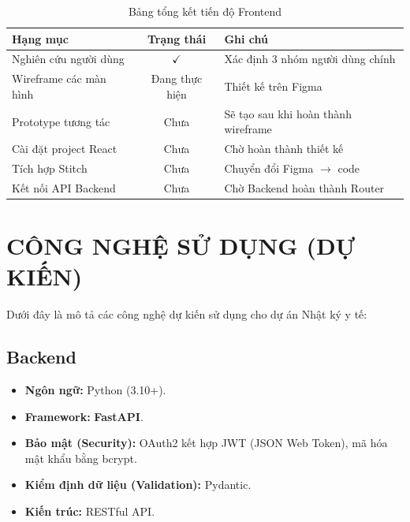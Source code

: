 \documentclass[a4paper,12pt]{article}
\begin{document}
\begin{table}[H]
    \centering
    \begin{tabularx}{\textwidth}{|l|c|X|}
    \hline
    \textbf{Hạng mục} & \textbf{Trạng thái} & \textbf{Ghi chú} \\
    \hline
    Nghiên cứu người dùng & $\checkmark$ & Xác định 3 nhóm người dùng chính \\
    \hline
    Wireframe các màn hình & Đang thực hiện & Thiết kế trên Figma \\
    \hline
    Prototype tương tác & Chưa & Sẽ tạo sau khi hoàn thành wireframe \\
    \hline
    Cài đặt project React & Chưa & Chờ hoàn thành thiết kế \\
    \hline
    Tích hợp Stitch & Chưa & Chuyển đổi Figma $\rightarrow$ code \\
    \hline
    Kết nối API Backend & Chưa & Chờ Backend hoàn thành Router \\
    \hline
    \end{tabularx}
    \caption{Bảng tổng kết tiến độ Frontend}
\end{table}

\section{CÔNG NGHỆ SỬ DỤNG (DỰ KIẾN)}

Dưới đây là mô tả các công nghệ dự kiến sử dụng cho dự án Nhật ký y tế:

\subsection{Backend}
\begin{itemize}
    \item \textbf{Ngôn ngữ:} Python (3.10+).
    \item \textbf{Framework:} \textbf{FastAPI}.
    \item \textbf{Bảo mật (Security):} OAuth2 kết hợp JWT (JSON Web Token), mã hóa mật khẩu bằng bcrypt.
    \item \textbf{Kiểm định dữ liệu (Validation):} Pydantic.
    \item \textbf{Kiến trúc:} RESTful API.
\end{itemize}
\end{document}
